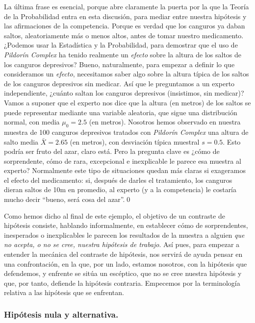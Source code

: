 \begin{ejemplo}
    La última frase es esencial, porque abre claramente la puerta por la que la Teoría de la Probabilidad entra en esta discusión, para mediar entre nuestra hipótesis y las afirmaciones de la competencia. Porque es verdad que los canguros ya daban saltos, aleatoriamente más o menos altos, antes de tomar nuestro medicamento. ¿Podemos usar la Estadística y la Probabilidad, para demostrar que el uso de {\em {\em Pildorín Complex}} ha tenido realmente un {\em efecto} sobre la altura de los saltos de los canguros depresivos? Bueno, naturalmente, para empezar a definir lo que consideramos un {\em efecto}, necesitamos saber algo sobre la altura típica de los saltos de los canguros depresivos sin medicar. Así que le preguntamos a un experto independiente, ¿cuánto saltan los canguros depresivos (insistimos, sin medicar)? Vamos a suponer que el experto nos dice que la altura (en metros) de los saltos se puede representar mediante una variable aleatoria, que sigue una distribución normal, con media $\mu_0=2.5$ (en metros). Nosotros hemos observado en nuestra muestra de 100 canguros depresivos tratados con {\em {\em Pildorín Complex}} una altura de salto media $\bar X=2.65$ (en metros), con desviación típica muestral $s=0.5$. Esto podría ser fruto del azar, claro está. Pero la pregunta clave es ¿cómo de sorprendente, cómo de rara, excepcional e inexplicable le parece esa muestra al experto? Normalmente este tipo de situaciones quedan más claras si exageramos el efecto del medicamento: si, después de darles el tratamiento, los canguros dieran saltos de 10m en promedio, al experto (y a la competencia) le costaría mucho decir ``bueno, será cosa del azar''.\qed
\end{ejemplo}
Como hemos dicho al final de este ejemplo, el objetivo de un contraste de hipótesis consiste, hablando informalmente, en establecer cómo de sorprendentes,  inesperados o inexplicables le parecen los resultados de la muestra a alguien {\em que no acepta, o no se cree, nuestra hipótesis de trabajo}. Así pues, para empezar a entender la mecánica del contraste de hipótesis, nos servirá de ayuda pensar en una confrontación, en la que, por un lado, estamos nosotros, con la hipótesis que defendemos, y enfrente se sitúa un escéptico, que no se cree nuestra hipótesis y que, por tanto, defiende la hipótesis contraria. Empecemos por la terminología relativa a las hipótesis que se enfrentan.

\subsubsection*{Hipótesis nula y alternativa.}
\label{cap07:subsubsec:HipotesisNulaAlternativa}

